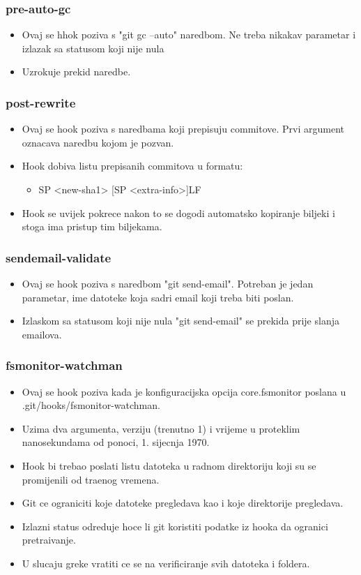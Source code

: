 \documentclass{beamer}
\begin{document}
\begin{frame}
\frametitle{pre-auto-gc}
\begin{itemize}
    \item Ovaj se hhok poziva s "git gc --auto" naredbom. Ne treba nikakav parametar i izlazak sa statusom koji nije nula 
    \item Uzrokuje prekid naredbe.
\end{itemize}
\end{frame}

\begin{frame}
\frametitle{post-rewrite}
\begin{itemize}
    \item Ovaj se hook poziva s naredbama koji prepisuju commitove. Prvi argument oznacava naredbu kojom je pozvan.
    \item Hook dobiva listu prepisanih commitova u formatu:
    \begin{itemize}
        \item <old-sha1> SP <new-sha1> [SP <extra-info>]LF
    \end{itemize}
    \item Hook se uvijek pokrece nakon to se dogodi automatsko kopiranje biljeki i stoga ima pristup tim biljekama.
\end{itemize}
\end{frame}

\begin{frame}
\frametitle{sendemail-validate}
\begin{itemize}
    \item Ovaj se hook poziva s naredbom "git send-email". Potreban je jedan parametar, ime datoteke koja sadri email koji treba biti poslan.
    \item Izlaskom sa statusom koji nije nula "git send-email" se prekida prije slanja emailova.

\end{itemize}
\end{frame}

\begin{frame}
\frametitle{fsmonitor-watchman}
\begin{itemize}
    \item Ovaj se hook poziva kada je konfiguracijska opcija core.fsmonitor poslana u .git/hooks/fsmonitor-watchman.
    \item Uzima dva argumenta, verziju (trenutno 1) i vrijeme u proteklim nanosekundama od ponoci, 1. sijecnja 1970.
    \item Hook bi trebao poslati listu datoteka u radnom direktoriju koji su se promijenili od traenog vremena.
    \item Git ce ograniciti koje datoteke pregledava kao i koje direktorije pregledava.
    \item Izlazni status odreduje hoce li git koristiti podatke iz hooka da ogranici pretraivanje.
    \item U slucaju greke vratiti ce se na verificiranje svih datoteka i foldera.
\end{itemize}
\end{frame}
\end{document}
